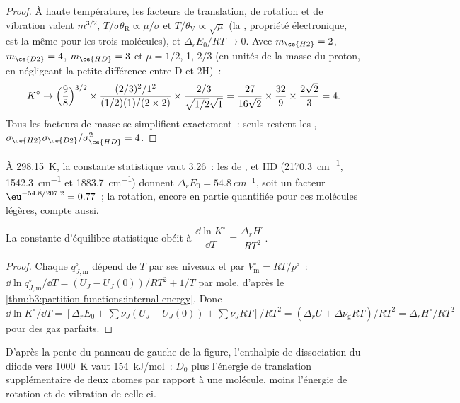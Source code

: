 \begin{proof}
À haute température, les facteurs de translation, de rotation et de
vibration valent
$m^{3/2}$, $T/\sigma\theta_{\mathrm R} \propto \mu/\sigma$ et $T/\theta_{\mathrm V} \propto \sqrt\mu$ (la
, propriété électronique, est la même pour les trois
molécules), et $\Delta_rE_0/RT \to 0$.
Avec $m_{\ce{H2}} = 2$, $m_{\ce{D2}} = 4$, $m_{\ce{HD}} = 3$ et
$\mu = 1/2$, 1, $2/3$ (en unités de la masse du proton, en négligeant la
petite différence entre D et 2H)~:
\[
  K^\circ \to \Bigl(\frac{9}{8}\Bigr)^{3/2} \times \frac{(2/3)^2/1^2}{(1/2)(1)/(2 \times 2)}
  \times \frac{2/3}{\sqrt{1/2}\sqrt1}
  = \frac{27}{16\sqrt2} \times \frac{32}{9} \times \frac{2\sqrt2}{3} = 4 .
\]
Tous les facteurs de masse se simplifient exactement~: seuls restent les
, $\sigma_{\ce{H2}}
\sigma_{\ce{D2}}/\sigma_{\ce{HD}}^2 = 4$.
\end{proof}

À \qty{298.15}{K}, la constante statistique vaut 3.26~: les  de ,
 et HD (\qty{2170.3}{cm^{-1}}, \qty{1542.3}{cm^{-1}} et \qty{1883.7}{cm^{-1}}) donnent $\Delta_rE_0 =
\qty{54.8}{cm^{-1}}$, soit un facteur $\eu^{-54.8/207.2} = 0.77$~; la
rotation, encore en partie quantifiée pour ces molécules légères, compte
aussi.

\begin{proposition}\label{prop:b3:statistical-thermo-applied:vant-hoff-stat}
La constante d'équilibre statistique obéit à $\dfrac{\dd\ln K^\circ}{\dd T} = \dfrac{\Delta_rH^\circ}{RT^2}$.
\end{proposition}

\begin{proof}
Chaque $q^\circ_{J,\mathrm m}$ dépend de $T$ par ses niveaux et par
$V^\circ_{\mathrm m} = RT/p^\circ$~:
$\dd\ln q^\circ_{J,\mathrm m}/\dd T = (U_J - U_J(0))/RT^2 + 1/T$ par
mole, d'après le
\cref{thm:b3:partition-functions:internal-energy}. Donc $\dd\ln K^\circ/\dd T =
[\Delta_rE_0 + \sum\nu_J(U_J - U_J(0)) + \sum\nu_JRT]/RT^2 = (\Delta_rU + \Delta\nu_{\mathrm g}RT)/RT^2 =
\Delta_rH^\circ/RT^2$ pour des gaz parfaits.
\end{proof}

D'après la pente du panneau de gauche de la figure, l'enthalpie de
dissociation du diiode vers \qty{1000}{K} vaut \qty{154}{kJ/mol}~:
$D_0$ plus l'énergie de translation supplémentaire de deux atomes par
rapport à une molécule, moins l'énergie de rotation et de vibration de
celle-ci.

